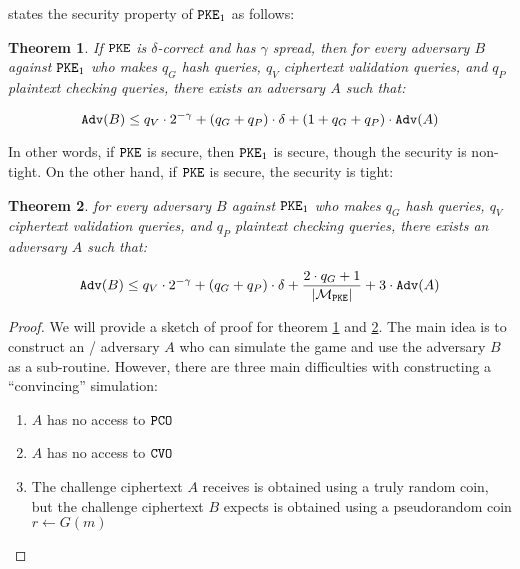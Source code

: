 \documentclass{article}
\newtheorem{theorem}{Theorem}[section]
\begin{document}
\cite{hofheinz2017modular} states the security property of $\texttt{PKE}_1$ as follows:

\begin{theorem}\label{thm:owcpa-implies-owpcva}
    If $\texttt{PKE}$ is $\delta$-correct and has $\gamma$ spread, then for every  adversary $B$ against $\texttt{PKE}_1$ who makes $q_G$ hash queries, $q_V$ ciphertext validation queries, and $q_P$ plaintext checking queries, there exists an  adversary $A$ such that:

    \begin{equation*}
        \texttt{Adv}(B) \leq q_V \cdot 2^{-\gamma}
            + (q_G + q_P) \cdot \delta
            + (1 + q_G + q_P) \cdot \texttt{Adv}(A)
    \end{equation*}
\end{theorem}

In other words, if $\texttt{PKE}$ is  secure, then $\texttt{PKE}_1$ is  secure, though the security is non-tight. On the other hand, if $\texttt{PKE}$ is  secure, the  security is tight:

\begin{theorem}\label{thm:indcpa-implies-owpcva}
    for every  adversary $B$ against $\texttt{PKE}_1$ who makes $q_G$ hash queries, $q_V$ ciphertext validation queries, and $q_P$ plaintext checking queries, there exists an  adversary $A$ such that:

    \begin{equation*}
        \texttt{Adv}(B) \leq q_V \cdot 2^{-\gamma}
            + (q_G + q_P) \cdot \delta
            + \frac{2 \cdot q_G + 1}{\left\lvert {\mathcal{M}_\texttt{PKE}} \right\rvert}
            + 3 \cdot \texttt{Adv}(A)
    \end{equation*}
\end{theorem}

\begin{proof}
    We will provide a sketch of proof for theorem \ref{thm:owcpa-implies-owpcva} and \ref{thm:indcpa-implies-owpcva}. The main idea is to construct an / adversary $A$ who can simulate the  game and use the  adversary $B$ as a sub-routine. However, there are three main difficulties with constructing a ``convincing'' simulation:

    \begin{enumerate}
        \item $A$ has no access to $\texttt{PCO}$
        \item $A$ has no access to $\texttt{CVO}$
        \item The challenge ciphertext $A$ receives is obtained using a truly random coin, but the challenge ciphertext $B$ expects is obtained using a pseudorandom coin $r \leftarrow G(m)$
    \end{enumerate}

\end{proof}
\end{document}
